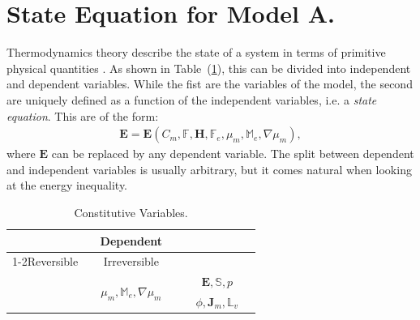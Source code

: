 \documentclass[runningheads]{llncs}
\newcommand{\F}{\ensuremath{\mathbb{F}}}
\newcommand{\LL}{\ensuremath{\mathbb{L}}}
\begin{document}
\section{State Equation for Model A.}
\label{stateequation}
Thermodynamics theory describe the state of a system in terms of primitive physical quantities \cite{GURTIN}. As shown in Table~(\ref{ind}), this can be divided into independent and dependent variables. While the fist are the variables of the model, the second are uniquely defined as a function of the independent variables, i.e. a \textit{state equation}. This are of the form: 
\begin{eqnarray}
\mathbf{E}=\mathbf{E}(C_m,\F,\mathbf{H},\F_e,\mu_m,\mathbb{M}_e,\nabla \mu_m),
\end{eqnarray}
where $\mathbf{E}$ can be replaced by any dependent variable. The split between dependent and independent variables is usually arbitrary, but it comes natural when looking at the energy inequality.
\vspace{3mm}
\begin{table}
	\centering
\begin{tabular}{|c|c|c|}
	\hline\addlinespace[2pt]
	\multicolumn{2}{|c|}{Independent} & \multirow{2}{*}{Dependent} \\
	\cline{1-2}\addlinespace[2pt]
	Reversible & Irreversible&\\[3pt]
	\hline\addlinespace[2pt]
\multirow{2}{*}{$\quad C_m,\ \F,\  \mathbf{H}, \F_e\quad$} & \multirow{2}{*}{$\quad\mu_m,\mathbb{M}_e,\nabla \mu_m\quad$} &	$\quad\mathbf{E}, \mathbb{S}, p\quad$ \\
&& $\quad\phi, \mathbf{J}_m,\LL_v\quad$\\[2pt]
\hline
\end{tabular}
\vspace{3mm}
\caption{Constitutive Variables.}
\label{ind}
\end{table}
\end{document}
